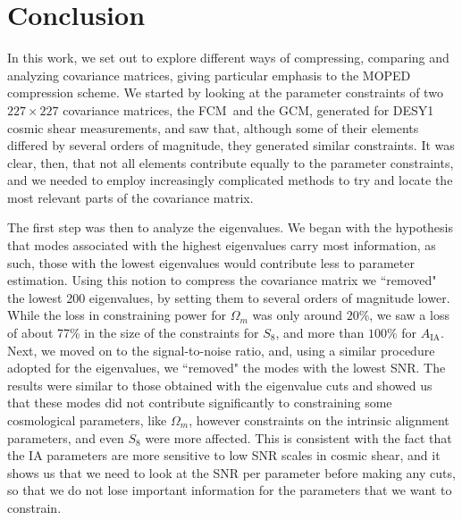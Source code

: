 \documentclass[aps, prd, twocolumn, superscriptaddress, nofootinbib, amssymb, amsmath]{revtex4-2}
\newcommand\full{the FCM}
\newcommand\gaussian{the GCM}
\begin{document}
\section{Conclusion}
\label{sec:conclusion}

In this work, we set out to explore different ways of compressing, comparing and analyzing covariance matrices, giving particular emphasis to the MOPED compression scheme. We started by looking at the parameter constraints of two $227 \times 227$ covariance matrices, \full\ and \gaussian, generated for DESY1 cosmic shear measurements, and saw that, although some of their elements differed by several orders of magnitude, they generated similar constraints. It was clear, then, that not all elements contribute equally to the parameter constraints, and we needed to employ increasingly complicated methods to try and locate the most relevant parts of the covariance matrix.

The first step was then to analyze the eigenvalues. We began with the hypothesis that modes associated with the highest eigenvalues carry most information, as such, those with the lowest eigenvalues would contribute less to parameter estimation. Using this notion to compress the covariance matrix we ``removed" the lowest 200 eigenvalues, by setting them to several orders of magnitude lower. While the loss in constraining power for $\Omega_m$ was only around $20\%$, we saw a loss of about 77\% in the size of the constraints for $S_8$, and more than $100\%$ for $A_{\text{IA}}$. Next, we moved on to the signal-to-noise ratio, and, using a similar procedure adopted for the eigenvalues, we ``removed" the modes with the lowest SNR. The results were similar to those obtained with the eigenvalue cuts and showed us that these modes did not contribute significantly to constraining some cosmological parameters, like $\Omega_m$, however constraints on the intrinsic alignment parameters, and even $S_8$ were more affected. This is consistent with the fact that the IA parameters are more sensitive to low SNR scales in cosmic shear, and it shows us that we need to look at the SNR per parameter before making any cuts, so that we do not lose important information for the parameters that we want to constrain.
\end{document}
